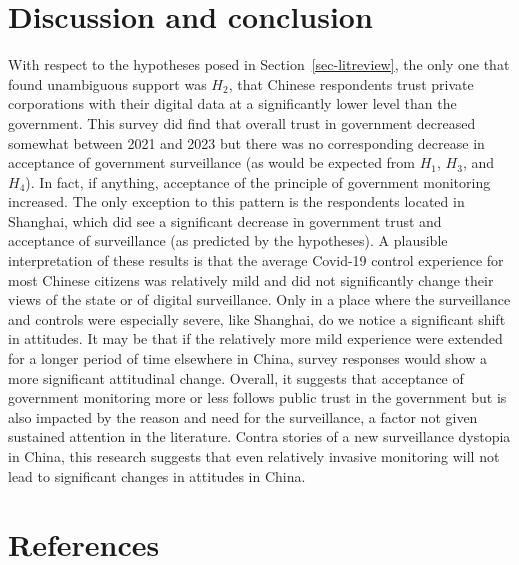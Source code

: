 \documentclass[
  letterpaper,
  DIV=11,
  numbers=noendperiod]{scrartcl}
\begin{document}
\begin{table}
\begin{minipage}[t]{\linewidth}
{}

\end{minipage}%

\end{table}

\hypertarget{discussion-and-conclusion}{%
\section{Discussion and conclusion}\label{discussion-and-conclusion}}

With respect to the hypotheses posed in Section~\ref{sec-litreview}, the
only one that found unambiguous support was \(H_2\), that Chinese
respondents trust private corporations with their digital data at a
significantly lower level than the government. This survey did find that
overall trust in government decreased somewhat between 2021 and 2023 but
there was no corresponding decrease in acceptance of government
surveillance (as would be expected from \(H_1\), \(H_3\), and \(H_4\)).
In fact, if anything, acceptance of the principle of government
monitoring increased. The only exception to this pattern is the
respondents located in Shanghai, which did see a significant decrease in
government trust and acceptance of surveillance (as predicted by the
hypotheses). A plausible interpretation of these results is that the
average Covid-19 control experience for most Chinese citizens was
relatively mild and did not significantly change their views of the
state or of digital surveillance. Only in a place where the surveillance
and controls were especially severe, like Shanghai, do we notice a
significant shift in attitudes. It may be that if the relatively more
mild experience were extended for a longer period of time elsewhere in
China, survey responses would show a more significant attitudinal
change. Overall, it suggests that acceptance of government monitoring
more or less follows public trust in the government but is also impacted
by the reason and need for the surveillance, a factor not given
sustained attention in the literature. Contra stories of a new
surveillance dystopia in China, this research suggests that even
relatively invasive monitoring will not lead to significant changes in
attitudes in China.

\newpage{}

\hypertarget{references}{%
\section{References}\label{references}}
\end{document}
